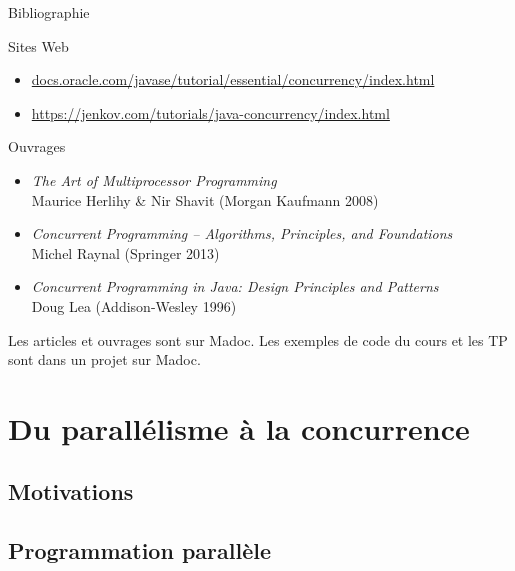 \begin{frame}{Bibliographie}
  \begin{block}{Sites Web}
    \begin{itemize}
    \item \href{http://docs.oracle.com/javase/tutorial/essential/concurrency/index.html}{docs.oracle.com/javase/tutorial/essential/concurrency/index.html}
    \item \href{https://jenkov.com/tutorials/java-concurrency/index.html}{https://jenkov.com/tutorials/java-concurrency/index.html}
    \end{itemize}
  \end{block}

  \vfill

  \begin{block}{Ouvrages}
    \begin{itemize}
    \item \textit{The Art of Multiprocessor Programming}\\ Maurice Herlihy \& Nir Shavit (Morgan Kaufmann 2008)
    \item \textit{Concurrent Programming -- Algorithms, Principles, and Foundations}\\ Michel Raynal (Springer 2013)
    \item \textit{Concurrent Programming in Java: Design Principles and Patterns}\\ Doug Lea (Addison-Wesley 1996)
    \end{itemize}
  \end{block}
  
  \vfill
  \vfill
  
  \begin{citing}
  \item Les articles et ouvrages sont sur Madoc.
    \jitem Les exemples de code du cours et les TP sont dans un projet sur Madoc.
  \end{citing}
\end{frame}


\section{Du parallélisme à la concurrence}
\subsection{Motivations}

\subsection{Programmation parallèle}

